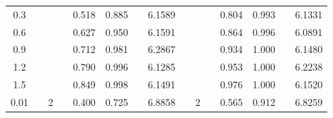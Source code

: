 \documentclass[12pt]{article}
\begin{document}
\begin{table}[!ht]
\begin{threeparttable}
\begin{tabular}{clllcllclllcclc}
0.3                                               &  &                               &  & 0.518                        & 0.885                                           &  & 6.1589                                                                    &  &                               &  & 0.804                                  & 0.993                                 &  & 6.1331                                                                    \\
0.6                                               &  &                               &  & 0.627                        & 0.950                                            &  & 6.1591                                                                    &  &                               &  & 0.864                                  & 0.996                                 &  & 6.0891                                                                    \\
0.9                                               &  &                               &  & 0.712                        & 0.981                                           &  & 6.2867                                                                    &  &                               &  & 0.934                                  & 1.000                                   &  & 6.1480                                                                     \\
1.2                                               &  &                               &  & 0.790                         & 0.996                                           &  & 6.1285                                                                    &  &                               &  & 0.953                                  & 1.000                                   &  & 6.2238                                                                    \\
1.5                                               &  &                               &  & 0.849                        & 0.998                                           &  & 6.1491                                                                    &  &                               &  & 0.976                                  & 1.000                                   &  & 6.1520                                                                     \\ \midrule
0.01                                              &  & 2                             &  & 0.400                          & 0.725                                           &  & 6.8858                                                                    &  & 2                             &  & 0.565                                  & 0.912                                 &  & 6.8259                                                                    \\

\end{tabular}
\end{threeparttable}
\end{table}
\end{document}

